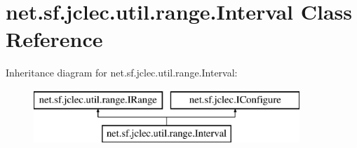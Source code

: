 \hypertarget{classnet_1_1sf_1_1jclec_1_1util_1_1range_1_1_interval}{\section{net.\-sf.\-jclec.\-util.\-range.\-Interval Class Reference}
\label{classnet_1_1sf_1_1jclec_1_1util_1_1range_1_1_interval}
}
Inheritance diagram for net.\-sf.\-jclec.\-util.\-range.\-Interval\-:\begin{figure}[H]
\begin{center}
\leavevmode
\includegraphics[height=2.000000cm]{classnet_1_1sf_1_1jclec_1_1util_1_1range_1_1_interval}
\end{center}
\end{figure}
